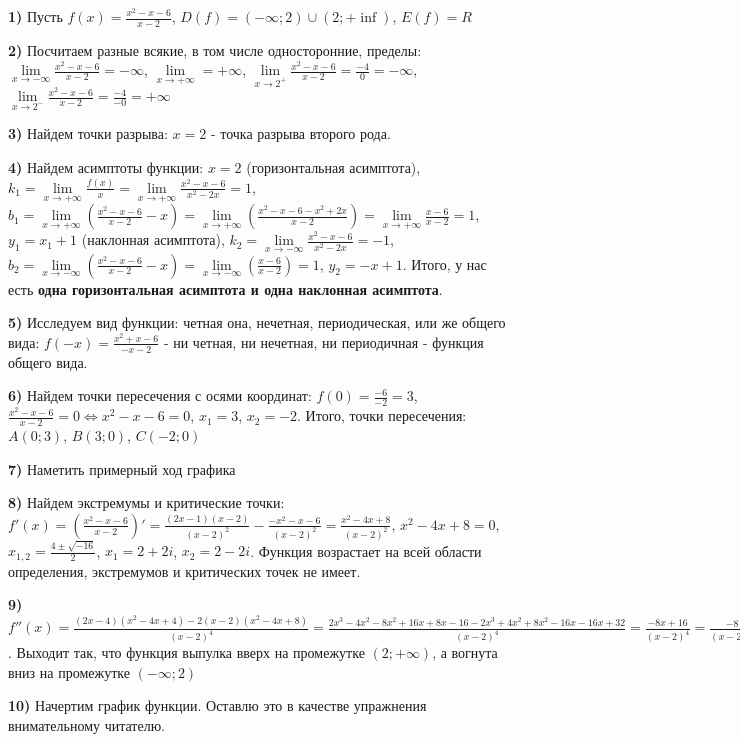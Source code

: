 \documentclass{article}
\begin{document}
\begin{flushleft}

\textbf{1) } Пусть $f(x) = \frac{x^2 - x - 6}{x - 2}$, $D(f) = (-\infty; 2) \cup (2; +\inf)$, $E(f) = R$

\textbf{2) } Посчитаем разные всякие, в том числе односторонние, пределы: $\lim\limits_{x \to -\infty} \frac{x^2 - x - 6}{x - 2} = -\infty$, $\lim\limits_{x \to +\infty} = +\infty$, $\lim\limits_{x \to 2^{+}} \frac{x^2 - x - 6}{x - 2} = \frac{-4}{0} = -\infty$, $\lim\limits_{x \to 2^{-}} \frac{x^2 - x - 6}{x - 2} = \frac{-4}{-0} = +\infty$

\textbf{3) } Найдем точки разрыва: $x = 2$ - точка разрыва второго рода.

\textbf{4) } Найдем асимптоты функции: $x = 2$ (горизонтальная асимптота), $k_1 = \lim\limits_{x \to +\infty} \frac{f(x)}{x} = \lim\limits_{x \to +\infty} \frac{x^2 - x - 6}{x^2 - 2x} = 1$, $b_1 = \lim\limits_{x \to +\infty} (\frac{x^2 - x - 6}{x - 2} - x) = \lim\limits_{x \to +\infty} (\frac{x^2 - x - 6 - x^2 + 2x}{x - 2}) = \lim\limits_{x \to +\infty} \frac{x - 6}{x - 2} = 1$, $y_1 = x_1 + 1$ (наклонная асимптота), $k_2 = \lim\limits_{x \to -\infty} \frac{x^2 - x - 6}{x^2 - 2x} = -1$, $b_2 = \lim\limits_{x \to -\infty} (\frac{x^2 - x - 6}{x - 2} - x) = \lim\limits_{x \to -\infty} (\frac{x - 6}{x - 2}) = 1$, $y_2 = -x + 1$. Итого, у нас есть \textbf{одна горизонтальная асимптота и одна наклонная асимптота}.

\textbf{5) } Исследуем вид функции: четная она, нечетная, периодическая, или же общего вида: $f(-x) = \frac{x^2 + x - 6}{-x - 2}$ - ни четная, ни нечетная, ни периодичная - функция общего вида.

\textbf{6) } Найдем точки пересечения с осями координат: $f(0) = \frac{-6}{-2} = 3$, $\frac{x^2 - x - 6}{x - 2} = 0 \Longleftrightarrow x^2 - x - 6 = 0$, $x_1 = 3$, $x_2 = -2$. Итого, точки пересечения: $A(0; 3)$, $B(3; 0)$, $C(-2; 0)$

\textbf{7) } Наметить примерный ход графика

\textbf{8) } Найдем экстремумы и критические точки: $f'(x) = (\frac{x^2 - x - 6}{x - 2})' = \frac{(2x - 1)(x - 2)}{(x - 2)^2} - \frac{-x^2 - x - 6}{(x - 2)^2} = \frac{x^2 - 4x + 8}{(x - 2)^2}$, $x^2 - 4x + 8 = 0$, $x_{1, 2} = \frac{4 \pm \sqrt{-16}}{2}$, $x_1 = 2 + 2i$, $x_2 = 2 - 2i$. Функция возрастает на всей области определения, экстремумов и критических точек не имеет.

\textbf{9) } $f''(x) = \frac{(2x - 4)(x^2 - 4x + 4) - 2(x - 2)(x^2 - 4x + 8)}{(x - 2)^4} = \frac{2x^3 - 4x^2 - 8x^2 + 16x + 8x - 16 - 2x^3 + 4x^2 + 8x^2 - 16x - 16x + 32}{(x - 2)^4} = \frac{-8x + 16}{(x - 2)^4} = \frac{-8}{(x - 2)^3}$. Выходит так, что функция выпулка вверх на промежутке $(2; +\infty)$, а вогнута вниз на промежутке $(-\infty; 2)$

\textbf{10) } Начертим график функции. Оставлю это в качестве упражнения внимательному читателю.

\end{flushleft}
\end{document}
